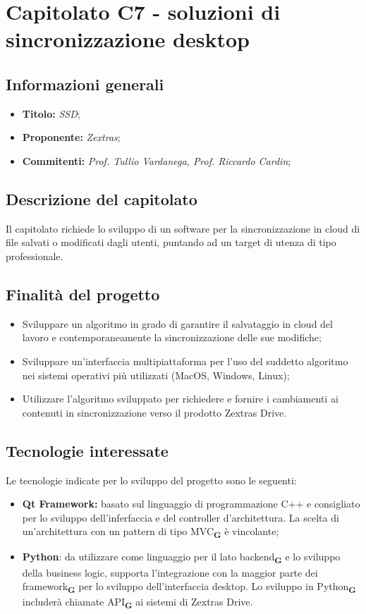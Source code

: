 \section{Capitolato C7 - soluzioni di sincronizzazione desktop}
\subsection{Informazioni generali}
\begin{itemize}
    \item \textbf{Titolo:} \textit{SSD};
    \item \textbf{Proponente:} \textit{Zextras};
    \item \textbf{Commitenti:} \textit{Prof. Tullio Vardanega, Prof. Riccardo Cardin};
\end{itemize}
\subsection{Descrizione del capitolato}
Il capitolato richiede lo sviluppo di un software per la sincronizzazione in cloud di file salvati o modificati dagli utenti, puntando ad un target di utenza di tipo professionale.
\subsection{Finalità del progetto}
\begin{itemize}
    \item Sviluppare un algoritmo in grado di garantire
          il salvataggio in cloud del lavoro e contemporaneamente la sincronizzazione
          delle sue modifiche;
    \item Sviluppare un’interfaccia multipiattaforma per l’uso
          del suddetto algoritmo nei sistemi operativi più utilizzati (MacOS,
          Windows, Linux);
    \item  Utilizzare l’algoritmo sviluppato per richiedere e fornire i
          cambiamenti ai contenuti in sincronizzazione verso il prodotto Zextras
          Drive.
\end{itemize}
\subsection{Tecnologie interessate}
Le tecnologie indicate per lo sviluppo del progetto sono le seguenti:
\begin{itemize}
    \item \textbf{Qt Framework:} basato sul linguaggio di programmazione C++ e consigliato per lo sviluppo dell'inferfaccia e del controller d'architettura. La scelta di un'architettura con un pattern di tipo MVC\textsubscript{\textbf{G}} è vincolante;
    \item \textbf{Python}: da utilizzare come linguaggio per il lato backend\textsubscript{\textbf{G}} e lo sviluppo della business logic, supporta l'integrazione con la maggior parte dei framework\textsubscript{\textbf{G}} per lo sviluppo dell'interfaccia desktop. Lo sviluppo in Python\textsubscript{\textbf{G}} includerà chiamate API\textsubscript{\textbf{G}} ai sistemi di Zextras Drive.
\end{itemize}
